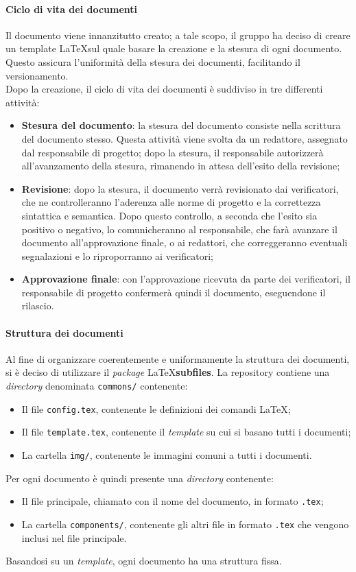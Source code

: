 \documentclass[../norme-di-progetto.tex]{subfiles}
\begin{document}
\paragraph{Ciclo di vita dei documenti}
Il documento viene innanzitutto creato; a tale scopo, il gruppo ha deciso di creare un template \LaTeX sul quale basare la creazione e la stesura di ogni documento. Questo assicura l'uniformità della stesura dei documenti, facilitando il versionamento. \\
Dopo la creazione, il ciclo di vita dei documenti è suddiviso in tre differenti attività:
\begin{itemize}
  \item \textbf{Stesura del documento}: la stesura del documento consiste nella scrittura del documento stesso. Questa attività viene svolta da un redattore, assegnato dal responsabile di progetto; dopo la stesura, il responsabile autorizzerà all'avanzamento della stesura, rimanendo in attesa dell'esito della revisione;
  \item \textbf{Revisione}: dopo la stesura, il documento verrà revisionato dai verificatori, che ne controlleranno l'aderenza alle norme di progetto e la correttezza sintattica e semantica. Dopo questo controllo, a seconda che l'esito sia positivo o negativo, lo comunicheranno al responsabile, che farà avanzare il documento all'approvazione finale, o ai  redattori, che correggeranno eventuali segnalazioni e lo riproporranno ai verificatori;
  \item \textbf{Approvazione finale}: con l'approvazione ricevuta da parte dei verificatori, il responsabile di progetto confermerà quindi il documento, eseguendone il rilascio.
\end{itemize}



\paragraph{Struttura dei documenti}
Al fine di organizzare coerentemente e uniformamente la struttura dei documenti, si è deciso di utilizzare il \textit{package} \LaTeX \textbf{subfiles}. La repository contiene una \textit{directory} denominata \texttt{commons/} contenente:
\begin{itemize}
  \item Il file \texttt{config.tex}, contenente le definizioni dei comandi \LaTeX;
  \item Il file \texttt{template.tex}, contenente il \textit{template} su cui si basano tutti i documenti;
  \item La cartella \texttt{img/}, contenente le immagini comuni a tutti i documenti.
\end{itemize}
Per ogni documento è quindi presente una \textit{directory} contenente:
\begin{itemize}
  \item  Il file principale, chiamato con il nome del documento, in formato \texttt{.tex};
  \item La cartella \texttt{components/}, contenente gli altri file in formato \texttt{.tex} che vengono inclusi nel file principale.
\end{itemize}
Basandosi su un \textit{template}, ogni documento ha una struttura fissa.
\end{document}
